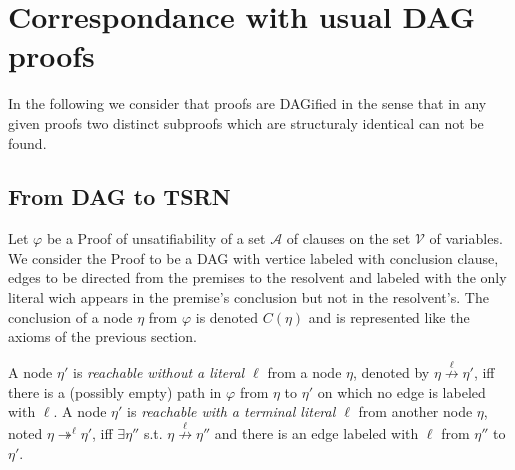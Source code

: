 \documentclass{article}
\newcommand{\varSet}{\mathcal{V}}
\newcommand{\axiomSet}{\mathcal{A}}
\newcommand{\Proof}{\varphi}
\newcommand{\node}{\eta}
\newcommand{\pConclusion}[1]{C\left(#1\right)} %
\newcommand{\nreach}[3]{#1 \overset{#2}{\nrightarrow} #3}
\newcommand{\treach}[3]{#1 \twoheadrightarrow^{#2} #3}
\begin{document}
\section{Correspondance with usual DAG proofs}

In the following we consider that proofs are DAGified in the sense that in any given proofs two
distinct subproofs which are structuraly identical can not be found.



\subsection{From DAG to TSRN}

Let $\Proof$ be a Proof of unsatifiability of a set $\axiomSet$ of clauses on the set $\varSet$ of
variables. We consider the Proof to be a DAG with vertice labeled with conclusion clause, edges to
be directed from the premises to the resolvent and labeled with the only literal wich appears in the
premise's conclusion but not in the resolvent's. The conclusion of a node $\node$ from $\Proof$ is
denoted $\pConclusion{\node}$ and is represented like the axioms of the previous section.

A node $\node'$ is \emph{reachable without a literal $\ell$} from a node $\node$, denoted by
$\nreach{\node}{\ell}{\node'}$, iff there is a (possibly empty) path in $\Proof$ from $\node$ to
$\node'$ on which no edge is labeled with $\ell$.
A node $\node'$ is \emph{reachable with a terminal literal $\ell$} from another node $\node$, noted
$\treach{\node}{\ell}{\node'}$, iff $\exists \node''$ s.t. $\nreach{\node}{\ell}{\node''}$ and there
is an edge labeled with $\ell$ from $\node''$ to $\node'$.
\end{document}
